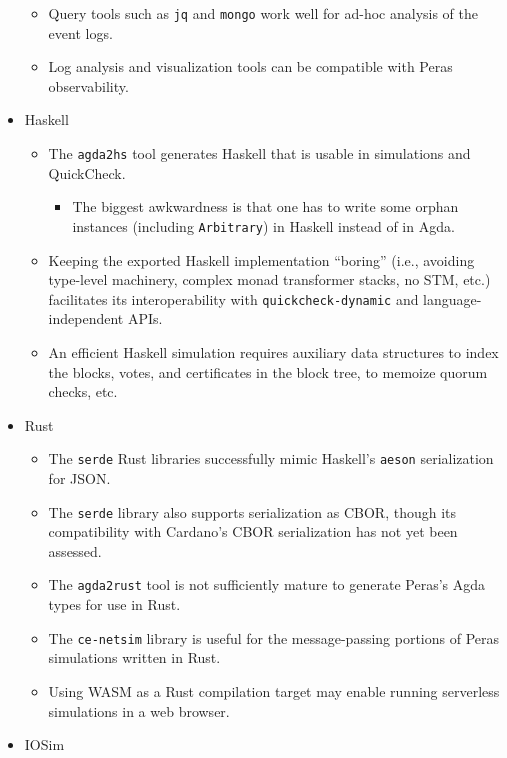\documentclass[10pt]{article}
\providecommand{\tightlist}{%
  \setlength{\itemsep}{0pt}\setlength{\parskip}{0pt}}
\begin{document}
\begin{itemize}
  \begin{itemize}
  \tightlist
  \item
    Query tools such as \texttt{jq} and \texttt{mongo} work well for
    ad-hoc analysis of the event logs.
  \item
    Log analysis and visualization tools can be compatible with Peras
    observability.
  \end{itemize}
\item
  Haskell

  \begin{itemize}
  \tightlist
  \item
    The \texttt{agda2hs} tool generates Haskell that is usable in
    simulations and QuickCheck.

    \begin{itemize}
    \tightlist
    \item
      The biggest awkwardness is that one has to write some orphan
      instances (including \texttt{Arbitrary}) in Haskell instead of in
      Agda.
    \end{itemize}
  \item
    Keeping the exported Haskell implementation ``boring'' (i.e.,
    avoiding type-level machinery, complex monad transformer stacks, no
    STM, etc.) facilitates its interoperability with
    \texttt{quickcheck-dynamic} and language-independent APIs.
  \item
    An efficient Haskell simulation requires auxiliary data structures
    to index the blocks, votes, and certificates in the block tree, to
    memoize quorum checks, etc.
  \end{itemize}
\item
  Rust

  \begin{itemize}
  \tightlist
  \item
    The \texttt{serde} Rust libraries successfully mimic Haskell's
    \texttt{aeson} serialization for JSON.
  \item
    The \texttt{serde} library also supports serialization as CBOR,
    though its compatibility with Cardano's CBOR serialization has not
    yet been assessed.
  \item
    The \texttt{agda2rust} tool is not sufficiently mature to generate
    Peras's Agda types for use in Rust.
  \item
    The \texttt{ce-netsim} library is useful for the message-passing
    portions of Peras simulations written in Rust.
  \item
    Using WASM as a Rust compilation target may enable running
    serverless simulations in a web browser.
  \end{itemize}
\item
  IOSim


\end{itemize}
\end{document}
